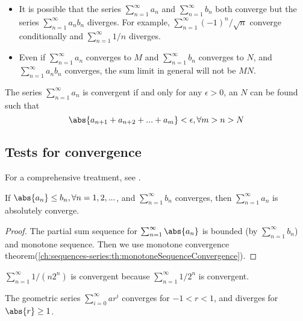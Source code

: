 \begin{refsection}
\begin{remark}\cite[76]{johnsonbaugh2010foundations}\hfill
\begin{itemize}
	\item It is possible that the series $\sum_{n=1}^\infty a_n$ and $\sum_{n=1}^\infty b_n$ both converge but the series $\sum_{n=1}^\infty a_nb_n$ diverges. For example, $\sum_{n=1}^\infty (-1)^n/\sqrt{n}$ converge conditionally and $\sum_{n=1}^\infty 1/n$ diverges.
	\item Even if $\sum_{n=1}^\infty a_n$  converges to $M$ and $\sum_{n=1}^\infty b_n$  converges to $N$, and $\sum_{n=1}^\infty a_nb_n$ converges, the sum limit in general will not be $MN$.
\end{itemize}	
\end{remark}

\begin{theorem}
The series $\sum_{n=1}^\infty a_n$  is convergent if and only for any $\epsilon > 0$, an $N$ can be found such that 
$$\abs{a_{n+1} + a_{n+2} + ... + a_m} < \epsilon, \forall m > n >N$$
\end{theorem}

\subsection{Tests for convergence}
For a comprehensive treatment, see \cite{kaplan1973advanced}. 

\begin{theorem}\label{ch:sequences-series:th:ConvergenceComparisonTestForSeries}
If $\abs{a_n} \leq b_n, \forall n=1,2,...$, and $\sum_{n=1}^\infty b_n$ converges, then $\sum_{n=1}^\infty a_n$ is absolutely converge.  
\end{theorem}
\begin{proof}
The partial sum sequence for $\sum_{n=1}^\infty \abs{a_n}$ is bounded (by $\sum_{n=1}^\infty b_n$) and monotone sequence. Then we use monotone convergence theorem(\autoref{ch:sequences-series:th:monotoneSequenceConvergence}). 	
\end{proof}


\begin{example}
$\sum_{n=1}^\infty 1/(n2^n)$ is convergent because $\sum_{n=1}^\infty 1/2^n$ is convergent. 
\end{example}

\begin{theorem}
The geometric series
$\sum_{i=0}^\infty ar^i$ converges for $-1<r<1$, and diverges for $\abs{r}\geq 1$.
\end{theorem}




\end{refsection}
